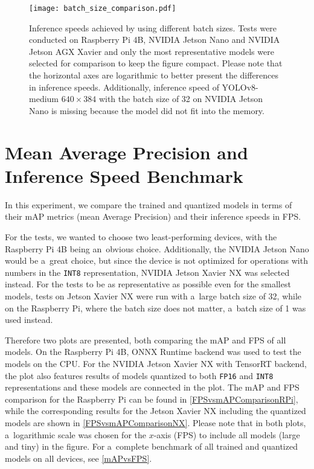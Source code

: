 \begin{figure}[H]
        \centering
        \texttt{[image: batch\_size\_comparison.pdf]}
        \caption{Inference speeds achieved by using different batch sizes. Tests
        were conducted on Raspberry Pi 4B, NVIDIA Jetson Nano and NVIDIA Jetson
        AGX Xavier and only the most representative models were selected for
        comparison to keep the figure compact. Please note that the horizontal
        axes are logarithmic to better present the differences in inference
        speeds. Additionally, inference speed of YOLOv8-medium $640 \times 384$
        with the batch size of 32 on NVIDIA Jetson Nano is missing because the
        model did not fit into the memory.}
        \label{BatchSizeComparison}
\end{figure}


\section{Mean Average Precision and Inference Speed Benchmark}
\label{FPSvsmAPComparison}

In this experiment, we compare the trained and quantized models in terms of
their mAP metrics (mean Average Precision) and their inference speeds in FPS.

For the tests, we wanted to choose two least-performing devices, with the
Raspberry Pi 4B being an~obvious choice. Additionally, the NVIDIA Jetson Nano
would be a~great choice, but since the device is not optimized for operations
with numbers in the \texttt{INT8} representation, NVIDIA Jetson Xavier NX was
selected instead. For the tests to be as representative as possible even for the
smallest models, tests on Jetson Xavier NX were run with a~large batch size of
32, while on the Raspberry Pi, where the batch size does not matter,
a~batch size of 1 was used instead.

Therefore two plots are presented, both comparing the mAP and FPS of all models.
On the Raspberry Pi 4B, ONNX Runtime backend was used to test the models on the
CPU. For the NVIDIA Jetson Xavier NX with TensorRT backend, the plot also
features results of models quantized to both \texttt{FP16} and \texttt{INT8}
representations and these models are connected in the plot. The mAP and FPS
comparison for the Raspberry Pi can be found in \autoref{FPSvsmAPComparisonRPi},
while the corresponding results for the Jetson Xavier NX including the quantized
models are shown in \autoref{FPSvsmAPComparisonNX}. Please note that in both
plots, a~logarithmic scale was chosen for the $x$-axis (FPS) to include all
models (large and tiny) in the figure. For a~complete benchmark of all trained
and quantized models on all devices, see \autoref{mAPvsFPS}.

